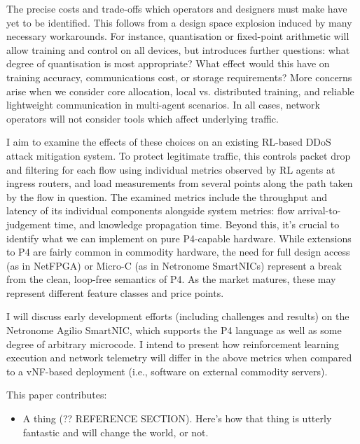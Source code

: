 \documentclass[sigconf,natbib=false]{acmart}
\begin{document}
The precise costs and trade-offs which operators and designers must make have yet to be identified. This follows from a design space explosion induced by many necessary workarounds. For instance, quantisation or fixed-point arithmetic will allow training and control on all devices, but introduces further questions: what degree of quantisation is most appropriate? What effect would this have on training accuracy, communications cost, or storage requirements? More concerns arise when we consider core allocation, local vs. distributed training, and reliable lightweight communication in multi-agent scenarios. In all cases, network operators will not consider tools which affect underlying traffic.

I aim to examine the effects of these choices on an existing RL-based DDoS attack mitigation system. To protect legitimate traffic, this controls packet drop and filtering for each flow using individual metrics observed by RL agents at ingress routers, and load measurements from several points along the path taken by the flow in question. The examined metrics include the throughput and latency of its individual components alongside system metrics: flow arrival-to-judgement time, and knowledge propagation time. Beyond this, it's crucial to identify what we can implement on pure P4-capable hardware. While extensions to P4 are fairly common in commodity hardware, the need for full design access (as in NetFPGA) or Micro-C (as in Netronome SmartNICs) represent a break from the clean, loop-free semantics of P4. As the market matures, these may represent different feature classes and price points.

I will discuss early development efforts (including challenges and results) on the Netronome Agilio SmartNIC, which supports the P4 language as well as some degree of arbitrary microcode. I intend to present how reinforcement learning execution and network telemetry will differ in the above metrics when compared to a vNF-based deployment (i.e., software on external commodity servers).

This paper contributes:
\begin{itemize}
	\item A thing (?? REFERENCE SECTION). Here's how that thing is utterly fantastic and will change the world, or not.
\end{itemize}
\end{document}
